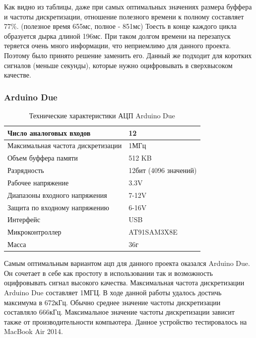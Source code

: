 \documentclass[../paper.tex]{subfiles}
\begin{document}
Как видно из таблицы, даже при самых оптимальных значениях размера буффера и частоты дискретизации, отношение полезного времени к полному составляет 77\%. (полезное время 655мс, полное -  851мс) Тоесть в конце каждого цикла образуется дырка длиной 196мс. При таком долгом времени на перезапуск теряется очень много информации, что неприемлимо для данного проекта. Поэтому было принято решение заменить его. Данный же подходит для коротких сигналов (меньше секунды), которые нужно оцифровывать в сверхвысоком качестве.

\subsubsection{Arduino Due}
\begin{table}[H]
\centering
\label{my-label}
\begin{tabular}{|l|l|}
                                                                      \hline
Число аналоговых входов            & 12                            \\ \hline
Максимальная частота дискретизации & 1МГц                          \\ \hline
Объем буффера памяти               & 512 KB					       \\ \hline
Разрядность                        & 12бит (4096 значений)         \\ \hline
Рабочее напряжение                 & 3.3V                          \\ \hline
Диапазоны входного напряжения      & 7-12V                         \\ \hline
Защита по входному напряжению      & 6-16V                         \\ \hline
Интерфейс                          & USB                           \\ \hline
Микроконтроллер                    & AT91SAM3X8E                   \\ \hline
Масса                              & 36г                           \\ \hline
\end{tabular}
\caption{Технические характеристики АЦП Arduino Due}
\end{table}

Самым оптимальным вариантом ацп для данного проекта оказался Arduino Due. Он сочетает в себе как простоту в использовании так и возможность оцифровывать сигнал высокого качества. Максимальная частота дискретизации Arduino Due составляет 1МГЦ. В ходе данной работы удалось достичь максимума в 672кГц. Обычно среднее значение частоты дискретизации составляло 666кГц. Максимальное значение частоты дискретизации зависит также от производительности компьютера. Данное устройство тестировалось на MacBook Air 2014.
\end{document}
